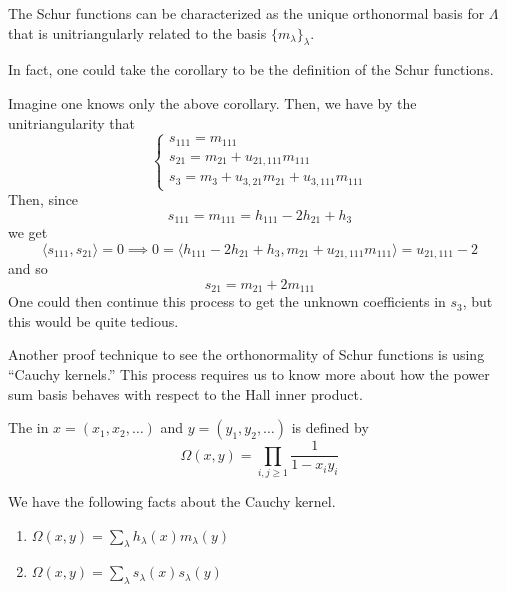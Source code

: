 \documentclass[11pt,leqno,oneside]{amsart}
\numberwithin{thm}{section}
\newcommand{\sym}{\Lambda}
\begin{document}
\begin{cor}
  The Schur functions can be characterized as the unique orthonormal
  basis for \(\sym\) that is unitriangularly related to the basis
  \(\{m_\lambda\}_{\lambda}\). 
\end{cor}
In fact, one could take the corollary to be the definition of the
Schur functions.
\begin{example}
  Imagine one knows only the above corollary. Then, we have by the
  unitriangularity that\[
    \begin{cases}
      s_{111} = m_{111} \\
      s_{21} = m_{21} + u_{21,111} m_{111}\\
      s_3 = m_3 + u_{3,21} m_{21} + u_{3,111}m_{111}
    \end{cases}
  \]
  Then, since \[
    s_{111} = m_{111} = h_{111}-2h_{21}+h_3
  \]
  we get
  \[
    \langle s_{111},s_{21} \rangle = 0 \implies 0 = \langle
    h_{111}-2h_{21}+h_3, 
    m_{21} + u_{21,111} m_{111} \rangle = u_{21,111}-2
  \]
  and so \[
    s_{21} = m_21 + 2m_{111}
  \]
  One could then continue this process to get the unknown coefficients
  in \(s_3\), but this would be quite tedious.
\end{example}
Another proof technique to see the orthonormality of Schur functions
is using ``Cauchy kernels.'' This process requires us to know more
about how the power sum basis behaves with respect to the Hall inner
product.
\begin{defn}
  The  in \(x = (x_1, x_2, \ldots)\) and \(y = (y_1,
  y_2, \ldots)\) is defined by \[
    \Omega(x,y) = \prod_{i,j \geq 1} \frac{1}{1-x_i y_i}
  \]
\end{defn}
\begin{prop}
  We have the following facts about the Cauchy kernel.
  \begin{enumerate}
  \item \(\Omega(x,y) = \sum_{\lambda} h_\lambda(x)m_\lambda(y)\)
  \item \(\Omega(x,y) = \sum_{\lambda} s_\lambda(x)s_\lambda(y)\)
  \end{enumerate}
\end{prop}
\end{document}
